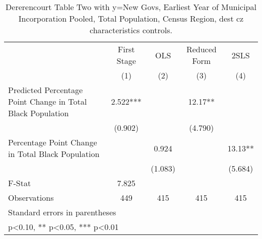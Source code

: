 \begin{table}[htbp]\centering
\def\sym#1{\ifmmode^{#1}\else\(^{#1}\)\fi}
\caption{Dererencourt Table Two with y=New Govs, Earliest Year of Municipal Incorporation  Pooled, Total Population, Census Region, dest cz characteristics controls.}
\begin{tabular}{l*{4}{c}}
\toprule
                    & First Stage   &         OLS   &Reduced Form   &        2SLS   \\
                    &\multicolumn{1}{c}{(1)}   &\multicolumn{1}{c}{(2)}   &\multicolumn{1}{c}{(3)}   &\multicolumn{1}{c}{(4)}   \\
\midrule
Predicted Percentage Point Change in Total Black Population&       2.522***&               &       12.17** &               \\
                    &     (0.902)   &               &     (4.790)   &               \\
\addlinespace
Percentage Point Change in Total Black Population&               &       0.924   &               &       13.13** \\
                    &               &     (1.083)   &               &     (5.684)   \\
\midrule
F-Stat              &       7.825   &               &               &               \\
Observations        &         449   &         415   &         415   &         415   \\
\bottomrule
\multicolumn{5}{l}{\footnotesize Standard errors in parentheses}\\
\multicolumn{5}{l}{\footnotesize * p<0.10, ** p<0.05, *** p<0.01}\\
\end{tabular}
\end{table}
